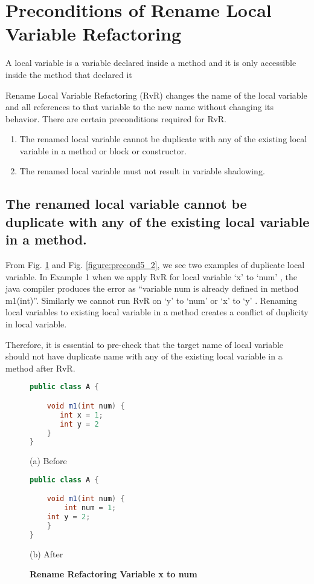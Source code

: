 \section{\textbf{Preconditions of Rename Local Variable Refactoring}}
A local variable is a variable declared inside a method and it is only accessible inside the method that declared it

Rename Local Variable Refactoring (RvR) changes the name of the local variable and all references to that variable to the new name without changing its behavior. There are certain preconditions required for RvR.
\begin{enumerate}
\item The renamed local variable cannot be duplicate with any of the existing local variable in a method or block or constructor.
\item The renamed local variable must not result in variable shadowing.
\end{enumerate}

\subsection{The renamed local variable cannot be duplicate with any of the existing local variable in a method.}
 
From Fig. \ref{figure:precond5_1} and Fig. \ref{figure:precond5_2}, we see two examples of duplicate local variable. In Example 1 when we apply RvR for local variable `x' to `num' , the java compiler produces the error as ``variable num is already defined in method m1(int)''. Similarly we cannot run RvR on  `y'  to `num' or `x'  to `y' . Renaming local variables to existing local variable in a method creates a conflict of duplicity in local variable.

Therefore, it is essential to pre-check that the target name of local variable should not have duplicate name with any of the existing local variable in a method after RvR.

\begin{figure}[th]
\centering
\begin{minipage}[t]{0.45\linewidth}
\begin{lstlisting}[language=java, basicstyle=\scriptsize\ttfamily,frame=single]
public class A {

    void m1(int num) {
       int x = 1; 
       int y = 2
    }
}
\end{lstlisting}
\centering(a) Before
\end{minipage}
\hfill
\begin{minipage}[t]{0.45\linewidth}
\begin{lstlisting}[language=java, basicstyle=\scriptsize\ttfamily,frame=single]
public class A {

    void m1(int num) {
        int num = 1; 
	int y = 2;
    }
}
\end{lstlisting}
\centering(b) After 
\end{minipage}
\caption{\textbf{Rename Refactoring Variable x to num}}
\label{figure:precond5_1}
\end{figure}

